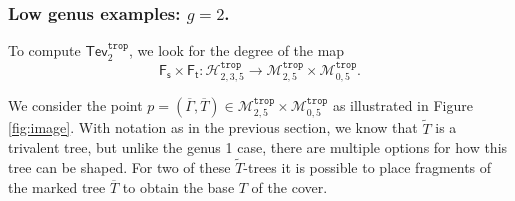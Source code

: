 \documentclass[11pt,reqno]{amsart}
\theoremstyle{definition}
\newcommand\trop{{\mathtt{trop}}}
\newcommand\Mgn[1]{\mathcal M_{#1}}
\newcommand\Hur[1]{\mathcal H_{#1}}
\newcommand{\Ft}{\mathsf{F_t}}
\newcommand{\Fs}{\mathsf{F_s}}
\newcommand{\Tev}{{\mathsf{Tev}}}
\begin{document}


\subsubsection{Low genus examples: $g=2$.}
To compute $\Tev_2^\trop$, we look for the degree of the map
\begin{equation}
    \Fs\times \Ft: \Hur{2,3,5}^\trop \to \Mgn{2,5}^\trop \times \Mgn{0,5}^\trop.
\end{equation}

We consider the point $p=(\overline{\Gamma},\overline{T})\in \Mgn{2,5}^\trop \times \Mgn{0,5}^\trop$ as illustrated in Figure \ref{fig:image}. With notation as in the previous section, we know that $\tilde{T}$ is a trivalent tree, but unlike the genus 1 case, there are multiple options for how this tree can be shaped. For two of these $\tilde{T}$-trees it is  possible to place fragments of the marked tree $\overline{T}$ to obtain the base $T$ of the cover. 
\end{document}
